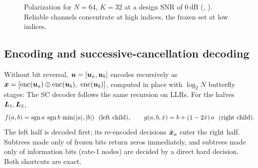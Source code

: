 \begin{figure}[htbp]
\centering
{}
\caption{Polarization for $N=64$, $K=32$ at a design SNR of 0\,dB (,
). Reliable channels concentrate at high indices, the frozen set at low
indices.}
\label{fig:polar}
\end{figure}

\subsection{Encoding and successive-cancellation decoding}
Without bit reversal, $\bm{u}=[\bm{u}_a,\bm{u}_b]$ encodes recursively as
$\bm{x}=[\mathrm{enc}(\bm{u}_a)\oplus\mathrm{enc}(\bm{u}_b),\ \mathrm{enc}(\bm{u}_b)]$,
computed in place with $\log_2N$ butterfly stages:
The SC decoder follows the same recursion on LLRs. For the halves $\bm{L}_1,\bm{L}_2$,
\begin{equation}
  f(a,b)=\sgn a\,\sgn b\,\min(|a|,|b|)\ \ (\text{left child}),\qquad
  g(a,b,\hat x)=b+(1-2\hat x)\,a\ \ (\text{right child}).
\end{equation}
The left half is decoded first; its re-encoded decisions $\hat{\bm{x}}_a$ enter the right half.
Subtrees made only of frozen bits return zeros immediately, and subtrees made only of
information bits (rate-1 nodes) are decided by a direct hard decision. Both shortcuts are exact.

